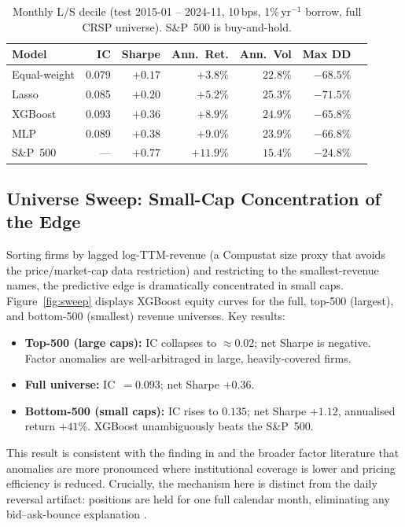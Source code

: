 \documentclass[11pt,a4paper]{article}
\begin{document}
\begin{table}[h]
\centering\small
\caption{Monthly L/S decile (test 2015-01 -- 2024-11, 10\,bps, 1\%\,yr$^{-1}$
borrow, full CRSP universe). S\&P~500 is buy-and-hold.}
\label{tab:monthly}
\begin{tabular}{lrrrrrr}
\toprule
Model & IC & Sharpe & Ann.\ Ret. & Ann.\ Vol & Max DD \\
\midrule
Equal-weight & 0.079 & $+0.17$ & $+3.8\%$ & $22.8\%$ & $-68.5\%$ \\
Lasso        & 0.085 & $+0.20$ & $+5.2\%$ & $25.3\%$ & $-71.5\%$ \\
XGBoost      & 0.093 & $+0.36$ & $+8.9\%$ & $24.9\%$ & $-65.8\%$ \\
MLP          & 0.089 & $+0.38$ & $+9.0\%$ & $23.9\%$ & $-66.8\%$ \\
\midrule
S\&P~500     & ---   & $+0.77$ & $+11.9\%$& $15.4\%$ & $-24.8\%$ \\
\bottomrule
\end{tabular}
\end{table}

\subsection{Universe Sweep: Small-Cap Concentration of the Edge}
\label{sec:sweep}

Sorting firms by lagged log-TTM-revenue (a Compustat size proxy that avoids the
price/market-cap data restriction) and restricting to the smallest-revenue
names, the predictive edge is dramatically concentrated in small caps.
Figure~\ref{fig:sweep} displays XGBoost equity curves for the full, top-500
(largest), and bottom-500 (smallest) revenue universes. Key results:

\begin{itemize}
  \item \textbf{Top-500 (large caps):} IC collapses to $\approx 0.02$; net
  Sharpe is negative. Factor anomalies are well-arbitraged in
  large, heavily-covered firms.
  \item \textbf{Full universe:} IC~$= 0.093$; net Sharpe $+0.36$.
  \item \textbf{Bottom-500 (small caps):} IC rises to $0.135$; net Sharpe
  $+1.12$, annualised return $+41\%$. XGBoost unambiguously beats the S\&P~500.
\end{itemize}

This result is consistent with the finding in \citet{gu2020} and the broader
factor literature that anomalies are more pronounced where institutional
coverage is lower and pricing efficiency is reduced. Crucially, the mechanism
here is distinct from the daily reversal artifact: positions are held for one
full calendar month, eliminating any bid--ask-bounce explanation
\citep{nagel2012}.
\end{document}
